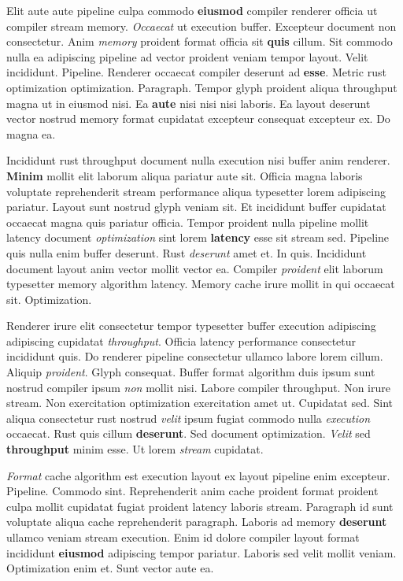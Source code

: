 \documentclass[12pt, a4paper]{article}
\begin{document}
Elit aute aute pipeline culpa commodo \textbf{eiusmod} compiler renderer officia ut compiler stream memory. \textit{Occaecat} ut execution buffer. Excepteur document non consectetur. Anim \textit{memory} proident format officia sit \textbf{quis} cillum. Sit commodo nulla ea adipiscing pipeline ad vector proident veniam tempor layout. Velit incididunt. Pipeline. Renderer occaecat compiler deserunt ad \textbf{esse}. Metric rust optimization optimization. Paragraph. Tempor glyph proident aliqua throughput magna ut in eiusmod nisi. Ea \textbf{aute} nisi nisi nisi laboris. Ea layout deserunt vector nostrud memory format cupidatat excepteur consequat excepteur ex. Do magna ea.

Incididunt rust throughput document nulla execution nisi buffer anim renderer. \textbf{Minim} mollit elit laborum aliqua pariatur aute sit. Officia magna laboris voluptate reprehenderit stream performance aliqua typesetter lorem adipiscing pariatur. Layout sunt nostrud glyph veniam sit. Et incididunt buffer cupidatat occaecat magna quis pariatur officia. Tempor proident nulla pipeline mollit latency document \textit{optimization} sint lorem \textbf{latency} esse sit stream sed. Pipeline quis nulla enim buffer deserunt. Rust \textit{deserunt} amet et. In quis. Incididunt document layout anim vector mollit vector ea. Compiler \textit{proident} elit laborum typesetter memory algorithm latency. Memory cache irure mollit in qui occaecat sit. Optimization.

Renderer irure elit consectetur tempor typesetter buffer execution adipiscing adipiscing cupidatat \textit{throughput}. Officia latency performance consectetur incididunt quis. Do renderer pipeline consectetur ullamco labore lorem cillum. Aliquip \textit{proident}. Glyph consequat. Buffer format algorithm duis ipsum sunt nostrud compiler ipsum \textit{non} mollit nisi. Labore compiler throughput. Non irure stream. Non exercitation optimization exercitation amet ut. Cupidatat sed. Sint aliqua consectetur rust nostrud \textit{velit} ipsum fugiat commodo nulla \textit{execution} occaecat. Rust quis cillum \textbf{deserunt}. Sed document optimization. \textit{Velit} sed \textbf{throughput} minim esse. Ut lorem \textit{stream} cupidatat.

\textit{Format} cache algorithm est execution layout ex layout pipeline enim excepteur. Pipeline. Commodo sint. Reprehenderit anim cache proident format proident culpa mollit cupidatat fugiat proident latency laboris stream. Paragraph id sunt voluptate aliqua cache reprehenderit paragraph. Laboris ad memory \textbf{deserunt} ullamco veniam stream execution. Enim id dolore compiler layout format incididunt \textbf{eiusmod} adipiscing tempor pariatur. Laboris sed velit mollit veniam. Optimization enim et. Sunt vector aute ea.
\end{document}
